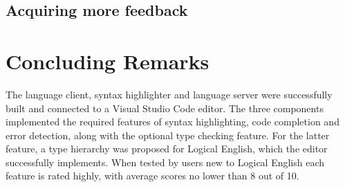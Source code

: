\documentclass[../main.tex]{subfiles}
\begin{document}
\subsection{Acquiring more feedback}

\section{Concluding Remarks}
The language client, syntax highlighter and language server were successfully built and connected to a Visual Studio Code editor. The three components implemented the required features of syntax highlighting, code completion and error detection, along with the optional type checking feature. For the latter feature, a type hierarchy was proposed for Logical English, which the editor successfully implements. When tested by users new to Logical English each feature is rated highly, with average scores no lower than 8 out of 10.
\end{document}
